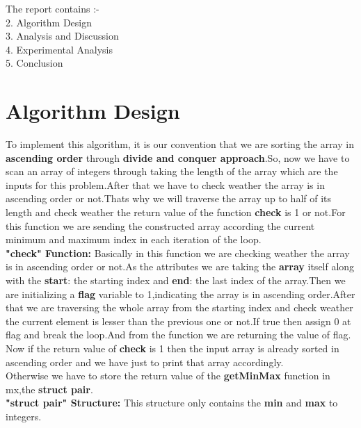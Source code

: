 \documentclass[conference]{IEEEtran}
\begin{document}
The report contains :-\\
2. Algorithm Design\\
3. Analysis and Discussion\\
4. Experimental Analysis\\
5. Conclusion\\

\section{\textbf{Algorithm Design}}  
To implement this algorithm, it is our convention that we are sorting the array in \textbf{ascending order} through \textbf{divide and conquer approach}.So, now we have to scan an array of integers through taking the length of the array which are the inputs for this problem.After that we have to check weather the array is in ascending order or not.Thats why we will traverse the array up to half of its length and check weather the return value of the function \textbf{check} is 1 or not.For this function we are sending the constructed array according the current minimum and maximum index in each iteration of the loop.\\

\textbf{"check" Function:} Basically in this function we are checking weather the array is in ascending order or not.As the attributes we are taking the \textbf{array} itself along with the \textbf{start}: the starting index and \textbf{end}: the last index of the array.Then we are initializing a \textbf{flag} variable to 1,indicating the array is in ascending order.After that we are traversing the whole array from the starting index and check weather the current element is lesser than the previous one or not.If true then assign 0 at flag and break the loop.And from the function we are returning the value of flag.\\

Now if the return value of \textbf{check} is 1 then the input array is already sorted in ascending order and we have just to print that array accordingly.\\

Otherwise we have to store the return value of the \textbf{getMinMax} function in mx,the \textbf{struct pair}.\\

 
 \textbf{"struct pair" Structure:} This structure only contains the \textbf{min} and \textbf{max} to integers.\\
\end{document}
